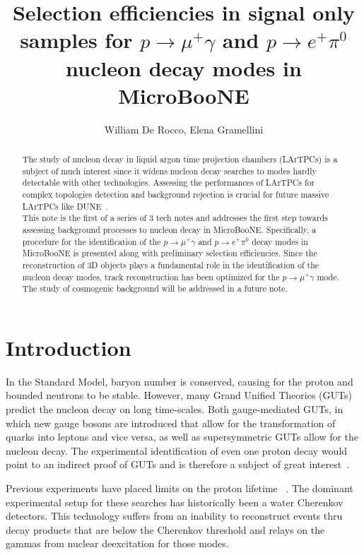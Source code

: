 \documentclass[a4paper, 10pt]{article}
\begin{document}
\title{Selection efficiencies in signal only samples for $p \rightarrow \mu^{+} \gamma$ and $p \rightarrow e^{+} \pi^{0}$ nucleon decay modes in MicroBooNE}
\author{William De Rocco, Elena Gramellini}

\maketitle

\begin{abstract}
The study of nucleon decay in liquid argon time projection chambers (LArTPCs) is a subject of much interest since it widens nucleon decay searches to modes hardly detectable with other technologies. Assessing the performances of LArTPCs  for complex topologies detection and background rejection is crucial for future massive LArTPCs like DUNE~\cite{Adams:2013qkq}.\\
This note is the first of a series of 3 tech notes and addresses the first step towards assessing background processes to nucleon decay in MicroBooNE. Specifically, a procedure for the identification of the $p \rightarrow \mu^{+} \gamma$ and $p \rightarrow e^{+} \pi^{0}$  decay modes in MicroBooNE is presented along with preliminary selection efficiencies. Since the reconstruction of 3D objects plays a fundamental role in the identification of the nucleon decay modes, track reconstruction has been optimized for the $p \rightarrow \mu^{+} \gamma$ mode. The study of cosmogenic background will be addressed in a future note.

\end{abstract}

\tableofcontents
\newpage

\section{Introduction}

In the Standard Model, baryon number is conserved, causing for the proton and bounded neutrons to be stable. However, many Grand Unified Theories (GUTs) predict the nucleon decay on long time-scales. Both gauge-mediated GUTs, in which new gauge bosons are introduced that allow for the transformation of quarks into leptons and vice versa, as well as supersymmetric GUTs allow for the nucleon decay. The experimental identification of even one proton decay would point to an indirect proof of GUTs and is therefore a subject of great interest~\cite{Adams:2013qkq}.

Previous experiments have placed limits on the proton lifetime ~\cite{Akiri:2011dv}. The dominant experimental setup for these searches has historically been a water Cherenkov detectors. This technology suffers from an inability to reconstruct  events  thru decay products that are below the Cherenkov threshold and relays on the gammas from nuclear deexcitation for those modes.
\end{document}

